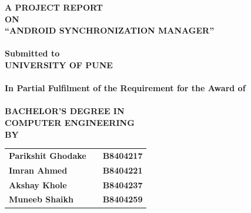 
\newpage


\begin{center}
\thispagestyle{empty}


\Large{\textbf{A PROJECT REPORT\\ON}}\\[0.7cm]
\Large{\textsc {\textbf{``ANDROID SYNCHRONIZATION MANAGER''}}}\\[0.5cm]
\Large{\textbf{\\Submitted to}}
\LARGE{\textbf{\\UNIVERSITY OF PUNE\\}}
\large{\textbf{\\In Partial Fulfilment of the Requirement for the Award of\\}}
\LARGE{\textbf{\\BACHELOR'S DEGREE IN\\COMPUTER ENGINEERING}}
\vspace{0.5cm}
\Large{\textbf{\\BY}}\\[0.5cm]
\begin{table}[h]
\centering
\Large{
\begin{tabular}{>{\bfseries}lc>{\bfseries}r}
Parikshit Ghodake & & B8404217\\Imran Ahmed & & B8404221\\Akshay Khole & & B8404237\\Muneeb Shaikh & & B8404259\\
\end{tabular}}
\end{table}




\end{center}

